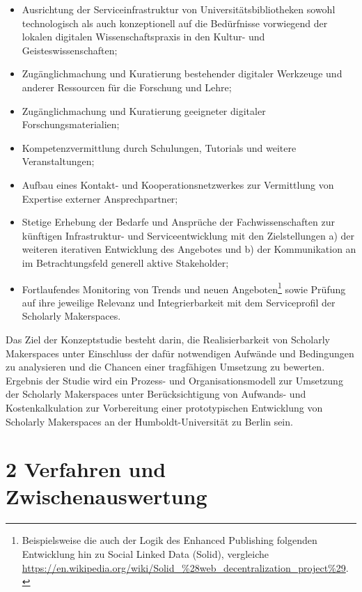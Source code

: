 \documentclass[a4paper,
fontsize=11pt,
oneside,
numbers=noperiodatend,
parskip=half-,
bibliography=totoc,
final
]{scrartcl}
\begin{document}
\begin{itemize}

\item
  Ausrichtung der Serviceinfrastruktur von Universitätsbibliotheken
  sowohl technologisch als auch konzeptionell auf die Bedürfnisse
  vorwiegend der lokalen digitalen Wissenschaftspraxis in den Kultur-
  und Geisteswissenschaften;
\item
  Zugänglichmachung und Kuratierung bestehender digitaler Werkzeuge und
  anderer Ressourcen für die Forschung und Lehre;
\item
  Zugänglichmachung und Kuratierung geeigneter digitaler
  Forschungsmaterialien;
\item
  Kompetenzvermittlung durch Schulungen, Tutorials und weitere
  Veranstaltungen;
\item
  Aufbau eines Kontakt- und Kooperationsnetzwerkes zur Vermittlung von
  Expertise externer Ansprechpartner;
\item
  Stetige Erhebung der Bedarfe und Ansprüche der Fachwissenschaften zur
  künftigen Infra\-struktur- und Serviceentwicklung mit den Zielstellungen
  a) der weiteren iterativen Entwicklung des Angebotes und b) der
  Kommunikation an im Betrachtungsfeld generell aktive Stakeholder;
\item
  Fortlaufendes Monitoring von Trends und neuen Angeboten\footnote{Beispielsweise
    die auch der Logik des Enhanced Publishing folgenden Entwicklung hin
    zu Social Linked Data (Solid), vergleiche
    \url{https://en.wikipedia.org/wiki/Solid_\%28web_decentralization_project\%29}.}
  sowie Prüfung auf ihre jeweilige Relevanz und Integrierbarkeit mit dem
  Serviceprofil der Scholarly Makerspaces.
\end{itemize}

Das Ziel der Konzeptstudie besteht darin, die Realisierbarkeit von
Scholarly Makerspaces unter Einschluss der dafür notwendigen Aufwände
und Bedingungen zu analysieren und die Chancen einer tragfähigen
Umsetzung zu bewerten. Ergebnis der Studie wird ein Prozess- und
Organisationsmodell zur Umsetzung der Scholarly Makerspaces unter
Berücksichtigung von Aufwands- und Kostenkalkulation zur Vorbereitung
einer prototypischen Entwicklung von Scholarly Makerspaces an der
Humboldt-Universität zu Berlin sein.

\hypertarget{verfahren-und-zwischenauswertung}{%
\section{2 Verfahren und
Zwischenauswertung}\label{verfahren-und-zwischenauswertung}}
\end{document}
